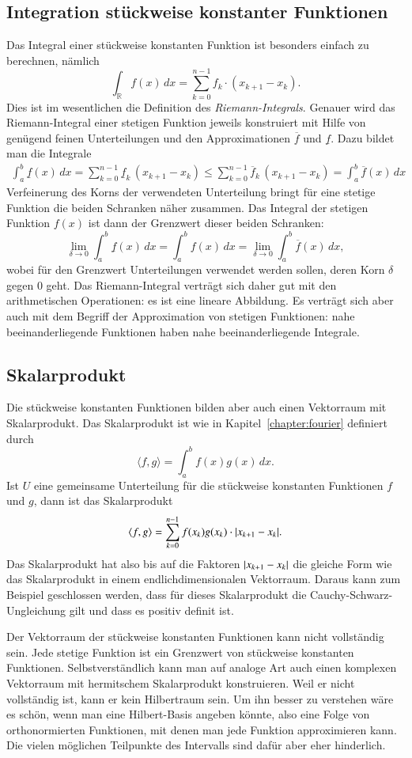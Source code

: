 \subsection{Integration stückweise konstanter Funktionen}
Das Integral einer stückweise konstanten Funktion ist besonders einfach 
zu berechnen, nämlich
\[
\int_{\mathbb R} f(x)\,dx = \sum_{k=0}^{n-1} f_k\cdot (x_{k+1}-x_k).
\]
Dies ist im wesentlichen die Definition des {\em Riemann-Integrals}.
%
Genauer wird das Riemann-Integral einer stetigen Funktion jeweils
konstruiert mit Hilfe von genügend feinen Unterteilungen und den
Approximationen $\overline{f}$ und $\underline{f}$.
Dazu bildet man die Integrale
\begin{align*}
\int_a^b \underline{f}(x)\,dx
=
\sum_{k=0}^{n-1} \underline{f}_{k}\,(x_{k+1}-x_k)
\le
\sum_{k=0}^{n-1} \overline{f}_{k}\,(x_{k+1}-x_k)
=
\int_a^b \overline{f}(x)\,dx
\end{align*}
Verfeinerung des Korns der verwendeten Unterteilung bringt für eine
stetige Funktion die beiden Schranken näher zusammen.
Das Integral der stetigen Funktion $f(x)$ ist dann der Grenzwert
dieser beiden Schranken:
\[
\lim_{\delta\to 0}
\int_a^b \underline{f}(x)\,dx
=
\int_a^b f(x)\,dx
=
\lim_{\delta\to 0}
\int_a^b \overline{f}(x)\,dx,
\]
wobei für den Grenzwert Unterteilungen verwendet werden sollen, deren
Korn $\delta$ gegen $0$ geht.
Das Riemann-Integral verträgt sich daher gut mit den arithmetischen
Operationen: es ist eine lineare Abbildung.
Es verträgt sich aber auch mit dem Begriff der Approximation von
stetigen Funktionen: nahe beeinanderliegende Funktionen haben nahe
beeinanderliegende Integrale.

\subsection{Skalarprodukt}
Die stückweise konstanten Funktionen bilden aber auch einen Vektorraum
mit Skalarprodukt.
Das Skalarprodukt ist wie in Kapitel~\ref{chapter:fourier} definiert durch
\[
\langle f,g\rangle
=
\int_a^b
f(x) g(x)\,dx.
\]
Ist $U$ eine gemeinsame Unterteilung für die stückweise konstanten
Funktionen $f$ und $g$, dann ist das Skalarprodukt
\[
\langle f,g\rangle
=
\sum_{k=0}^{n-1} f(x_k) g(x_k) \cdot |x_{k+1}-x_{k\mathstrut}|.
\]
Das Skalarprodukt hat also bis auf die Faktoren $|x_{k+1}-x_{k\mathstrut}|$
die gleiche Form wie das Skalarprodukt in einem endlichdimensionalen
Vektorraum.
Daraus kann zum Beispiel geschlossen werden, dass für dieses Skalarprodukt
die Cauchy-Schwarz-Ungleichung gilt und dass es positiv definit ist.

Der Vektorraum der stückweise konstanten Funktionen kann nicht vollständig
sein.
Jede stetige Funktion ist ein Grenzwert von stückweise konstanten
Funktionen.
Selbstverständlich kann man auf analoge Art auch einen komplexen
Vektorraum mit hermitschem Skalarprodukt konstruieren.
Weil er nicht vollständig ist, kann er kein Hilbertraum sein.
Um ihn besser zu verstehen wäre es schön, wenn man eine Hilbert-Basis
angeben könnte, also eine Folge von orthonormierten Funktionen, mit
denen man jede Funktion approximieren kann.
Die vielen möglichen Teilpunkte des Intervalls sind dafür aber eher 
hinderlich.

